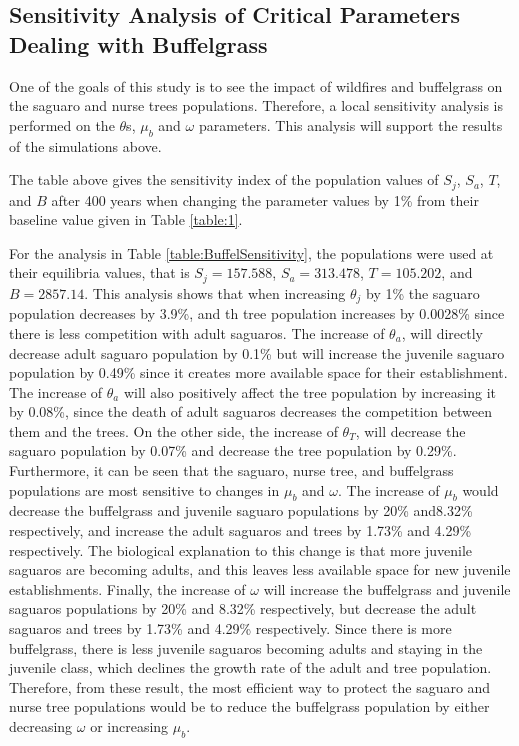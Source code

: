 \documentclass[a4paper]{article}
\begin{document}
\subsection{Sensitivity Analysis of Critical Parameters Dealing with Buffelgrass}
One of the goals of this study is to see the impact of wildfires and buffelgrass on the saguaro and nurse trees populations. Therefore, a local sensitivity analysis is performed on the $\theta$s, $\mu_b$ and $\omega$ parameters. This analysis will support the results of the simulations above.
\begin{table}[H]

\caption{The table above gives the sensitivity index of the population values of $S_j$, $S_a$, $T$, and $B$ after 400 years when changing the parameter values by 1\% from their baseline value given in Table \ref{table:1}.}
\label{table:BuffelSensitivity}
\end{table}
For the analysis in Table \ref{table:BuffelSensitivity}, the populations were used at their equilibria values, that is $S_j= 157.588$, $S_a=313.478$, $T=105.202$, and $B=2857.14$. This analysis shows that when increasing $\theta_j$ by 1\% the saguaro population decreases by 3.9\%, and th tree population increases by 0.0028\% since there is less competition with adult saguaros. The increase of $\theta_a$, will directly decrease adult saguaro population by 0.1\% but will increase the juvenile saguaro population by 0.49\% since it creates more available space for their establishment. The increase of $\theta_a$ will also positively affect the tree population by increasing it by 0.08\%, since the death of adult saguaros decreases the competition between them and the trees. On the other side, the increase of $\theta_T$, will decrease the saguaro population by 0.07\% and decrease the tree population by 0.29\%. Furthermore, it can be seen that the saguaro, nurse tree, and buffelgrass populations are most sensitive to changes in $\mu_b$ and $\omega$. The increase of $\mu_b$ would decrease the buffelgrass and juvenile saguaro populations by 20\% and8.32\% respectively, and increase the adult saguaros and trees by 1.73\% and 4.29\% respectively. The biological explanation to this change is that more juvenile saguaros are becoming adults, and this leaves less available space for new juvenile establishments. Finally, the increase of $\omega$ will increase the buffelgrass and juvenile saguaros populations by 20\% and 8.32\% respectively, but decrease the adult saguaros and trees by 1.73\% and 4.29\% respectively. Since there is more buffelgrass, there is less juvenile saguaros becoming adults and staying in the juvenile class, which declines the growth rate of the adult and tree population. Therefore, from these result, the most efficient way to protect the saguaro and nurse tree populations would be to reduce the buffelgrass population by either decreasing $\omega$ or increasing $\mu_b$. 
\end{document}
